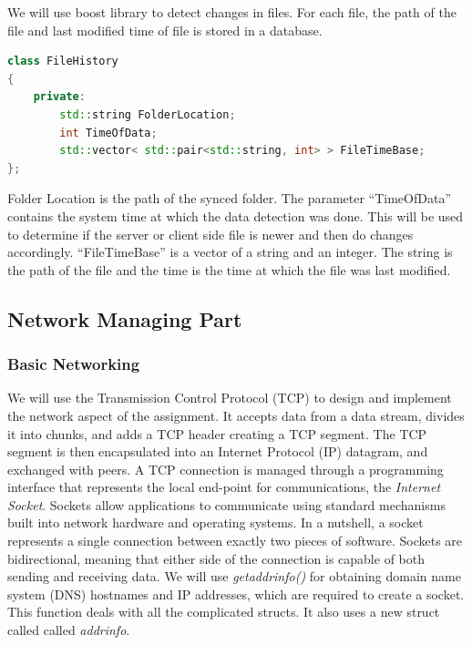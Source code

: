 \documentclass{article}
\begin{document}
			We will use boost library to detect changes in files. For each file, the path of the file and last modified time of file is stored in a database.

			\begin{lstlisting}[language=C++, caption={Class Parameters for File History}]
class FileHistory
{
	private:
		std::string FolderLocation;
		int TimeOfData;
		std::vector< std::pair<std::string, int> > FileTimeBase;
};
			\end{lstlisting}

			Folder Location is the path of the synced folder. The parameter ``TimeOfData'' contains the system time at which the data detection was done. This will be used to determine if the server or client side file is newer and then do changes accordingly. ``FileTimeBase'' is a vector of a string and an integer. The string is the path of the file and the time is the time at which the file was last modified.
			
			\subsection{Network Managing Part}
				\subsubsection{Basic Networking}
				We will use the Transmission Control Protocol (TCP) to design and implement the network aspect of the assignment. It accepts data from a data stream, divides it into chunks, and adds a TCP header creating a TCP segment. The TCP segment is then encapsulated into an Internet Protocol (IP) datagram, and exchanged with peers. A TCP connection is managed through a programming interface that represents the local end-point for communications, the \textit{Internet Socket}. Sockets allow applications to communicate using standard mechanisms built into network hardware and operating systems. In a nutshell, a socket represents a single connection between exactly two pieces of software. Sockets are bidirectional, meaning that either side of the connection is capable of both sending and receiving data.
				\newline
				We will use \textit{getaddrinfo()} for obtaining domain name system (DNS) hostnames and IP addresses, which are required to create a socket.  This function deals with all the complicated structs. It also uses a new struct called called \textit{addrinfo}. 
\end{document}
